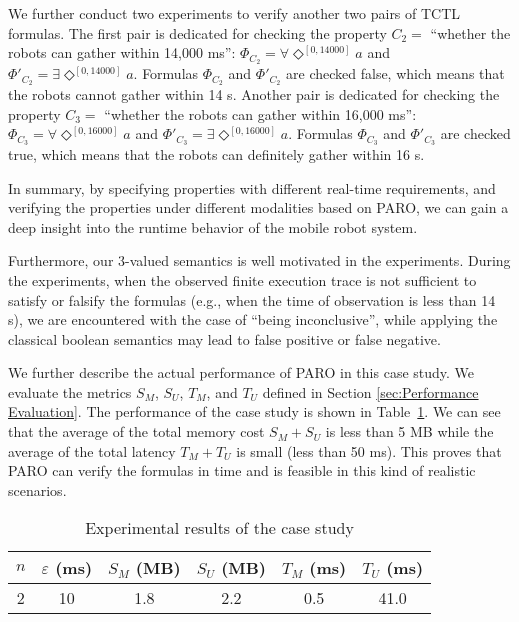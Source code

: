 \documentclass[10pt,conference,compsocconf,letterpaper]{IEEEtran}
\begin{document}
We further conduct two experiments to verify another two pairs of TCTL formulas. The first pair is dedicated for checking the property $C_2=$ ``whether the robots can gather within 14,000 ms'': $\Phi_{C_2}=\forall \Diamond^{[0, 14000]} a$ and $\Phi'_{C_2}=\exists \Diamond^{[0, 14000]} a$. Formulas $\Phi_{C_2}$ and $\Phi'_{C_2}$ are checked false, which means that the robots cannot gather within 14 s. Another pair is dedicated for checking the property $C_3=$ ``whether the robots can gather within 16,000 ms'': $\Phi_{C_3}=\forall \Diamond^{[0, 16000]} a$ and $\Phi'_{C_3}=\exists \Diamond^{[0, 16000]} a$. Formulas $\Phi_{C_3}$ and $\Phi'_{C_3}$ are checked true, which means that the robots can definitely gather within 16 s.

In summary, by specifying properties with different real-time requirements, and verifying the properties under different modalities based on \textsf{PARO}, we can gain a deep insight into the runtime behavior of the mobile robot system.

Furthermore, our 3-valued semantics is well motivated in the experiments. During the experiments, when the observed finite execution trace is not sufficient to satisfy or falsify the formulas (e.g., when the time of observation is less than 14 s), we are encountered with the case of ``being inconclusive'', while applying the classical boolean semantics may lead to false positive or false negative.

We further describe the actual performance of \textsf{PARO} in this case study. We evaluate the metrics $S_M$, $S_U$, $T_M$, and $T_U$ defined in Section \ref{sec:Performance Evaluation}. The performance of the case study is shown in Table~\ref{T:case study}. We can see that the average of the total memory cost $S_M + S_U$ is less than 5 MB while the average of the total latency $T_M + T_U$ is small (less than 50 ms). This proves that \textsf{PARO} can verify the formulas in time and is feasible in this kind of realistic scenarios.
\begin{table}[tbp]
    \caption{Experimental results of the case study}
    \label{T:case study}
    \centering
    \begin{tabular}{cc|cccc}\hline
        $n$ & $\varepsilon$ (ms) & $S_{M}$ (MB) & $S_{U}$ (MB) & $T_{M}$ (ms) & $T_{U}$ (ms) \\ \hline\hline
        2 & 10 & 1.8 & 2.2 & 0.5 & 41.0 \\ \hline
    \end{tabular}
\end{table}
\end{document}
